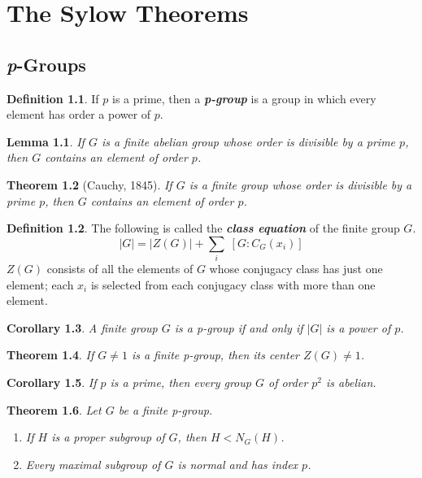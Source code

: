 \documentclass[12pt]{report}
\newtheorem{theorem}{Theorem}[chapter]
\newtheorem{corollary}[theorem]{Corollary}
\newtheorem{lemma}[theorem]{Lemma}
\theoremstyle{definition}
\newtheorem*{definition}{Definition}
\newcommand{\term}[1]{\textbf{\textit{#1}}}
\begin{document}
\chapter{The Sylow Theorems}

\section{\textit{p}-Groups}
\begin{definition}
	If $p$ is a prime, then a \term{p-group} is a group in which every element has order a power of $p$.
\end{definition}

\begin{lemma}
	If $G$ is a finite abelian group whose order is divisible by a prime $p$, then $G$ contains an element of order $p$.
\end{lemma}

\begin{theorem}[Cauchy, 1845]
	If $G$ is a finite group whose order is divisible by a prime $p$, then $G$ contains an element of order $p$.
\end{theorem}

\begin{definition}
	The following is called the \term{class equation} of the finite group $G$.
	\[ |G| = |Z(G)| + \sum_i \; \left[ G : C_G(x_i) \right] \]
	$Z(G)$ consists of all the elements of $G$ whose conjugacy class has just one element; each $x_i$ is selected from each conjugacy class with more than one element.
\end{definition}

\begin{corollary}
	A finite group $G$ is a p-group if and only if $|G|$ is a power of $p$.
\end{corollary}

\begin{theorem}
	If $G\neq 1$ is a finite p-group, then its center $Z(G)\neq 1$.
\end{theorem}

\begin{corollary}
	If $p$ is a prime, then every group $G$ of order $p^2$ is abelian.
\end{corollary}

\begin{theorem}
	Let $G$ be a finite p-group.
	\begin{enumerate}
		\item If $H$ is a proper subgroup of $G$, then $H<N_G(H)$.
		\item Every maximal subgroup of $G$ is normal and has index $p$.
	\end{enumerate}
\end{theorem}
\end{document}
